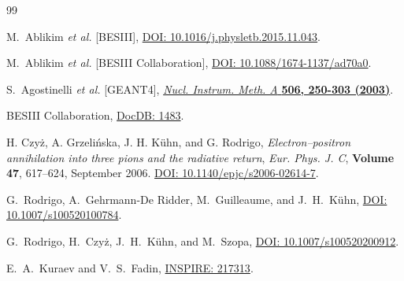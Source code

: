 \begin{thebibliography}{99}

    M.~Ablikim \textit{et al.} [BESIII],
    \href{https://doi.org/10.1016/j.physletb.2015.11.043}{DOI: 10.1016/j.physletb.2015.11.043}.

    M.~Ablikim \textit{et al.} [BESIII Collaboration],
    \href{https://doi.org/10.1088/1674-1137/ad70a0}{DOI: 10.1088/1674-1137/ad70a0}.

    S.~Agostinelli \textit{et al.} [GEANT4],
    \href{https://doi.org/10.1016/S0168-9002(03)01368-8}{\emph{Nucl. Instrum. Meth. A} \textbf{506, 250-303 (2003)}}.

    BESIII Collaboration,
    \href{https://docbes3.ihep.ac.cn/cgi-bin/DocDB/ShowDocument?docid=1483}{DocDB: 1483}.

    H. Czyż, A. Grzelińska, J. H. Kühn, and G. Rodrigo,
    \emph{Electron–positron annihilation into three pions and the radiative return},
    \emph{Eur. Phys. J. C}, \textbf{Volume 47}, 617--624, September 2006.
    \href{https://doi.org/10.1140/epjc/s2006-02614-7}{DOI: 10.1140/epjc/s2006-02614-7}.

    G.~Rodrigo, A.~Gehrmann-De Ridder, M.~Guilleaume, and J.~H.~Kühn,
    \href{https://doi.org/10.1007/s100520100784}{DOI: 10.1007/s100520100784}.

    G.~Rodrigo, H.~Czyż, J.~H.~Kühn, and M.~Szopa,
    \href{https://doi.org/10.1007/s100520200912}{DOI: 10.1007/s100520200912}.




    E.~A.~Kuraev and V.~S.~Fadin,
    \href{https://inspirehep.net/literature/217313}{INSPIRE: 217313}.


\end{thebibliography}
